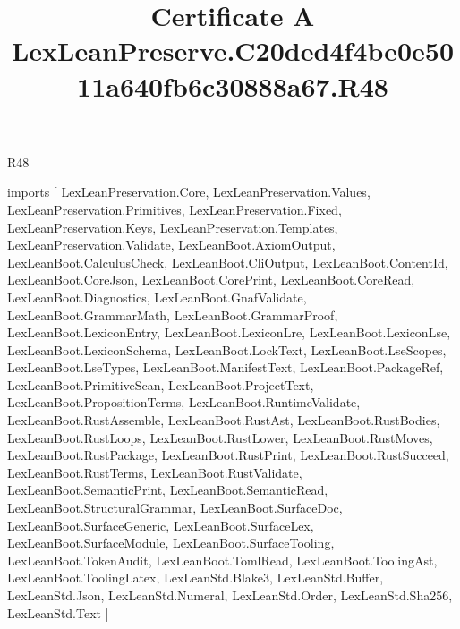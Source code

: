 \begin{lexlean}{R48}
\title{Certificate A LexLeanPreserve.C20ded4f4be0e5011a640fb6c30888a67.R48}
\begin{coremodule}
imports [
  LexLeanPreservation.Core,
  LexLeanPreservation.Values,
  LexLeanPreservation.Primitives,
  LexLeanPreservation.Fixed,
  LexLeanPreservation.Keys,
  LexLeanPreservation.Templates,
  LexLeanPreservation.Validate,
  LexLeanBoot.AxiomOutput,
  LexLeanBoot.CalculusCheck,
  LexLeanBoot.CliOutput,
  LexLeanBoot.ContentId,
  LexLeanBoot.CoreJson,
  LexLeanBoot.CorePrint,
  LexLeanBoot.CoreRead,
  LexLeanBoot.Diagnostics,
  LexLeanBoot.GnafValidate,
  LexLeanBoot.GrammarMath,
  LexLeanBoot.GrammarProof,
  LexLeanBoot.LexiconEntry,
  LexLeanBoot.LexiconLre,
  LexLeanBoot.LexiconLse,
  LexLeanBoot.LexiconSchema,
  LexLeanBoot.LockText,
  LexLeanBoot.LseScopes,
  LexLeanBoot.LseTypes,
  LexLeanBoot.ManifestText,
  LexLeanBoot.PackageRef,
  LexLeanBoot.PrimitiveScan,
  LexLeanBoot.ProjectText,
  LexLeanBoot.PropositionTerms,
  LexLeanBoot.RuntimeValidate,
  LexLeanBoot.RustAssemble,
  LexLeanBoot.RustAst,
  LexLeanBoot.RustBodies,
  LexLeanBoot.RustLoops,
  LexLeanBoot.RustLower,
  LexLeanBoot.RustMoves,
  LexLeanBoot.RustPackage,
  LexLeanBoot.RustPrint,
  LexLeanBoot.RustSucceed,
  LexLeanBoot.RustTerms,
  LexLeanBoot.RustValidate,
  LexLeanBoot.SemanticPrint,
  LexLeanBoot.SemanticRead,
  LexLeanBoot.StructuralGrammar,
  LexLeanBoot.SurfaceDoc,
  LexLeanBoot.SurfaceGeneric,
  LexLeanBoot.SurfaceLex,
  LexLeanBoot.SurfaceModule,
  LexLeanBoot.SurfaceTooling,
  LexLeanBoot.TokenAudit,
  LexLeanBoot.TomlRead,
  LexLeanBoot.ToolingAst,
  LexLeanBoot.ToolingLatex,
  LexLeanStd.Blake3,
  LexLeanStd.Buffer,
  LexLeanStd.Json,
  LexLeanStd.Numeral,
  LexLeanStd.Order,
  LexLeanStd.Sha256,
  LexLeanStd.Text
]


\end{coremodule}
\end{lexlean}

